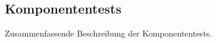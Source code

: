 %



\newpage



\label{Abschnitt:Tests:Protokoll:Komponenten}



\subsection*{Komponententests}

Zusammenfassende Beschreibung der Komponententests.




%








